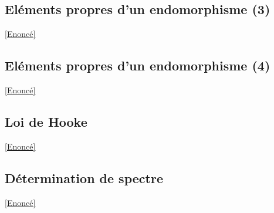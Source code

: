 \documentclass[8pt]{book}
\begin{document}
	\subsection{Eléments propres d'un endomorphisme (3)}
	\label{Eléments propres d'un endomorphisme (3) corrigé}
	\textcolor{blue}{\hyperref[Eléments propres d'un endomorphismes (3)]{[Enoncé]}}\\
	
	\subsection{Eléments propres d'un endomorphisme (4)}
	\label{Eléments propres d'un endomorphisme (4) corrigé}
	\textcolor{blue}{\hyperref[Eléments propres d'un endomorphismes (4)]{[Enoncé]}}\\
	
	\subsection{Loi de Hooke}
	\label{Loi de Hooke corrigé}
	\textcolor{blue}{\hyperref[Loi de Hooke]{[Enoncé]}}\\
	
	\subsection{Détermination de spectre}
	\label{Détermination de spectre corrigé}
	\textcolor{blue}{\hyperref[Détermination de spectre]{[Enoncé]}}\\
	
\end{document}
